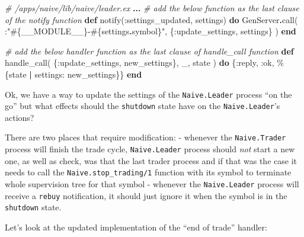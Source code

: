 \documentclass[
  oneside]{book}
\newenvironment{Shaded}{\begin{snugshade}}{\end{snugshade}}
\newcommand{\CommentTok}[1]{\textcolor[rgb]{0.56,0.35,0.01}{\textit{#1}}}
\newcommand{\ConstantTok}[1]{\textcolor[rgb]{0.00,0.00,0.00}{#1}}
\newcommand{\KeywordTok}[1]{\textcolor[rgb]{0.13,0.29,0.53}{\textbf{#1}}}
\newcommand{\NormalTok}[1]{#1}
\newcommand{\OperatorTok}[1]{\textcolor[rgb]{0.81,0.36,0.00}{\textbf{#1}}}
\newcommand{\OtherTok}[1]{\textcolor[rgb]{0.56,0.35,0.01}{#1}}
\newcommand{\StringTok}[1]{\textcolor[rgb]{0.31,0.60,0.02}{#1}}
\newcommand{\VariableTok}[1]{\textcolor[rgb]{0.00,0.00,0.00}{#1}}
\begin{document}
\begin{Shaded}
\begin{Highlighting}[]
\CommentTok{\# /apps/naive/lib/naive/leader.ex}
  \OperatorTok{...}
  \CommentTok{\# add the below function as the last clause of the \textasciigrave{}notify\textasciigrave{} function}
  \KeywordTok{def}\NormalTok{ notify(}\VariableTok{:settings\_updated}\NormalTok{, settings) }\KeywordTok{do}
    \ConstantTok{GenServer}\OperatorTok{.}\NormalTok{call(}
\NormalTok{      :}\StringTok{"}\OtherTok{\#\{}\ConstantTok{\_\_MODULE\_\_}\OtherTok{\}}\StringTok{{-}}\OtherTok{\#\{}\NormalTok{settings}\OperatorTok{.}\NormalTok{symbol}\OtherTok{\}}\StringTok{"}\NormalTok{,}
\NormalTok{      \{}\VariableTok{:update\_settings}\NormalTok{, settings\}}
\NormalTok{    )}
  \KeywordTok{end}

  \CommentTok{\# add the below handler function as the last clause of \textasciigrave{}handle\_call\textasciigrave{} function}
  \KeywordTok{def}\NormalTok{ handle\_call(}
\NormalTok{        \{}\VariableTok{:update\_settings}\NormalTok{, new\_settings\},}
\NormalTok{        \_,}
\NormalTok{        state}
\NormalTok{      ) }\KeywordTok{do}
\NormalTok{    \{}\VariableTok{:reply}\NormalTok{, }\VariableTok{:ok}\NormalTok{, \%\{state }\OperatorTok{|} \VariableTok{settings:}\NormalTok{ new\_settings\}\}}
  \KeywordTok{end}
\end{Highlighting}
\end{Shaded}

Ok, we have a way to update the settings of the \texttt{Naive.Leader} process ``on the go'' but what effects should the \texttt{shutdown} state have on the \texttt{Naive.Leader}'s actions?

There are two places that require modification:
- whenever the \texttt{Naive.Trader} process will finish the trade cycle, \texttt{Naive.Leader} process should \emph{not} start a new one, as well as check, was that the last trader process and if that was the case it needs to call the \texttt{Naive.stop\_trading/1} function with its symbol to terminate whole supervision tree for that symbol
- whenever the \texttt{Naive.Leader} process will receive a \texttt{rebuy} notification, it should just ignore it when the symbol is in the \texttt{shutdown} state.

Let's look at the updated implementation of the ``end of trade'' handler:
\end{document}
